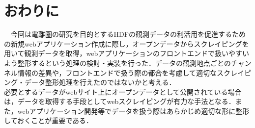 \section{おわりに}
　今回は電離圏の研究を目的とするHDFの観測データの利活用を促進するための新規webアプリケーション作成に際し，オープンデータからスクレイピングを用いて観測データを取得，webアプリケーションのフロントエンドで扱いやすいよう整形するという処理の検討・実装を行った．データの観測地点ごとのチャンネル情報の差異や，フロントエンドで扱う際の都合を考慮して適切なスクレイピング・データ整形処理を行えたのではないかと考える．\\
 必要とするデータがwebサイト上にオープンデータとして公開されている場合は，データを取得する手段としてwebスクレイピングが有力な手法となる．また，webアプリケーション開発等でデータを扱う際はあらかじめ適切な形に整形しておくことが重要である．\\
　

